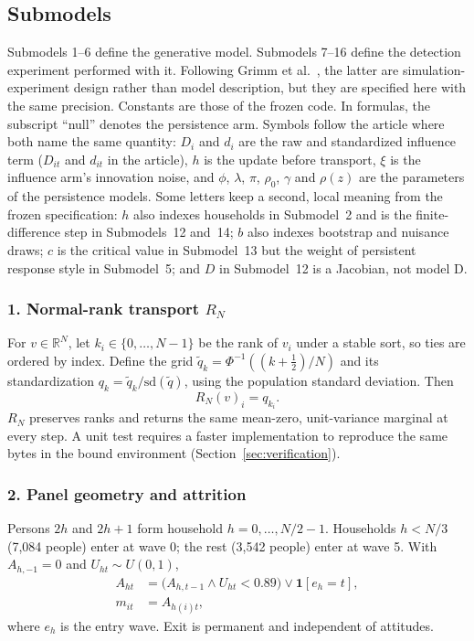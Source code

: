 \subsection{Submodels}

Submodels 1--6 define the generative model. Submodels 7--16 define the detection experiment performed with it. Following Grimm et al.\ \cite{grimm2020odd}, the latter are simulation-experiment design rather than model description, but they are specified here with the same precision. Constants are those of the frozen code. In formulas, the subscript ``null'' denotes the persistence arm. Symbols follow the article where both name the same quantity: $D_i$ and $d_i$ are the raw and standardized influence term ($D_{it}$ and $d_{it}$ in the article), $h$ is the update before transport, $\xi$ is the influence arm's innovation noise, and $\phi$, $\lambda$, $\pi$, $\rho_0$, $\gamma$ and $\rho(z)$ are the parameters of the persistence models. Some letters keep a second, local meaning from the frozen specification: $h$ also indexes households in Submodel~2 and is the finite-difference step in Submodels~12 and~14; $b$ also indexes bootstrap and nuisance draws; $c$ is the critical value in Submodel~13 but the weight of persistent response style in Submodel~5; and $D$ in Submodel~12 is a Jacobian, not model D.

\subsubsection*{1. Normal-rank transport $R_N$}
For $v\in\mathbb R^N$, let $k_i\in\{0,\ldots,N-1\}$ be the rank of $v_i$ under a stable sort, so ties are ordered by index. Define the grid $\tilde q_k=\Phi^{-1}((k+\tfrac12)/N)$ and its standardization $q_k=\tilde q_k/\mathrm{sd}(\tilde q)$, using the population standard deviation. Then
\begin{equation*}
R_N(v)_i=q_{k_i}.
\end{equation*}
$R_N$ preserves ranks and returns the same mean-zero, unit-variance marginal at every step. A unit test requires a faster implementation to reproduce the same bytes in the bound environment (Section~\ref{sec:verification}).

\subsubsection*{2. Panel geometry and attrition}
Persons $2h$ and $2h+1$ form household $h=0,\ldots,N/2-1$. Households $h<N/3$ (7,084 people) enter at wave 0; the rest (3,542 people) enter at wave 5. With $A_{h,-1}=0$ and $U_{ht}\sim U(0,1)$,
\begin{align*}
A_{ht}&=\bigl(A_{h,t-1}\wedge U_{ht}<0.89\bigr)\vee\mathbf 1[e_h=t],\\
m_{it}&=A_{h(i)t},
\end{align*}
where $e_h$ is the entry wave. Exit is permanent and independent of attitudes.

